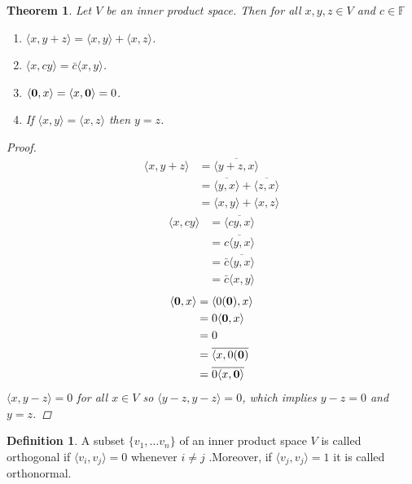 \documentclass[oneside, 12pt]{book}
\newtheorem{thm}{Theorem}[section]
\theoremstyle{definition}
\newtheorem{defn}{Definition}[section]
\begin{document}
\begin{thm}
  \label{thm_inprodprop}
  Let $V$ be an inner product space. Then for all $x,y,z \in V$ and $c \in \mathbb{F}$
  \begin{enumerate}
    \item $\langle x , y+z \rangle = \langle x , y \rangle + \langle x , z \rangle$.
    \item $\langle x, cy \rangle=\bar{c} \langle x , y \rangle $.
    \item $\langle \bold{0} ,  x \rangle= \langle x , \bold{0} \rangle = 0$.
    \item If $\langle x , y \rangle= \langle x , z \rangle$ then $y=z$.
  \end{enumerate}
  \begin{proof}
\begin{align}
  \langle x , y+z \rangle &= \overline{\langle y+z , x \rangle} \\
              &= \overline{\langle y , x \rangle} + \overline{\langle z , x \rangle} \\
              &= \langle x , y \rangle + \langle x , z \rangle
\end{align}
\begin{align}
  \langle x , cy \rangle &= \overline{\langle cy , x \rangle} \\
             &= \overline{c \langle y , x \rangle} \\
             &= \bar{c} \overline{\langle y , x \rangle} \\
             &= \bar{c} \langle x , y \rangle
\end{align}
\begin{align}
  \langle \bold{0}, x \rangle &= \langle 0(\bold{0}), x \rangle \\
                  &= 0\langle\bold{0}, x \rangle \\
                  &= 0 \\
                  &= \overline{\langle x , 0(\bold{0})} \\
                  &= \overline{0\langle x , \bold{0} \rangle} \\
\end{align}
$\langle x , y-z \rangle=0$ for all $x \in V$ so $\langle y-z , y-z \rangle = 0$, which implies $y-z=0$ and $y=z$.
\end{proof}
\end{thm}
\begin{defn}
  \label{defn_orthog}
A subset $\{v_{1}, \dots v_{n}\}$ of an inner product space $V$ is called orthogonal if $\langle v_{i}, v_{j} \rangle = 0$ whenever $i \neq j$ .Moreover, if $\langle v_{j} , v_{j} \rangle=1$ it is called orthonormal.
\end{defn}
\end{document}
